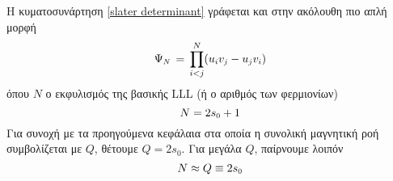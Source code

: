 Η κυματοσυνάρτηση \eqref{slater determinant} γράφεται και στην ακόλουθη πιο απλή μορφή \cite{PhysRevLett.51.605}
\begin{equation}\label{haldane manyparticle wavefunction}
    \Psi\subscr{N}\,=\,\prod^{N}_{i<j}(u\subscr{i}v\subscr{j}-u\subscr{j}v\subscr{i})
\end{equation}
όπου $Ν$ ο εκφυλισμός της βασικής LLL (ή ο αριθμός των φερμιονίων)
\begin{equation}
    N=2s\subscr{0}+1
\end{equation}
Για συνοχή με τα προηγούμενα κεφάλαια 
στα οποία η συνολική μαγνητική ροή συμβολίζεται με $Q$, θέτουμε $Q=2s_0$. Για μεγάλα $Q$, παίρνουμε λοιπόν
\begin{equation}
    N\approx Q\equiv 2s\subscr{0}
\end{equation}

